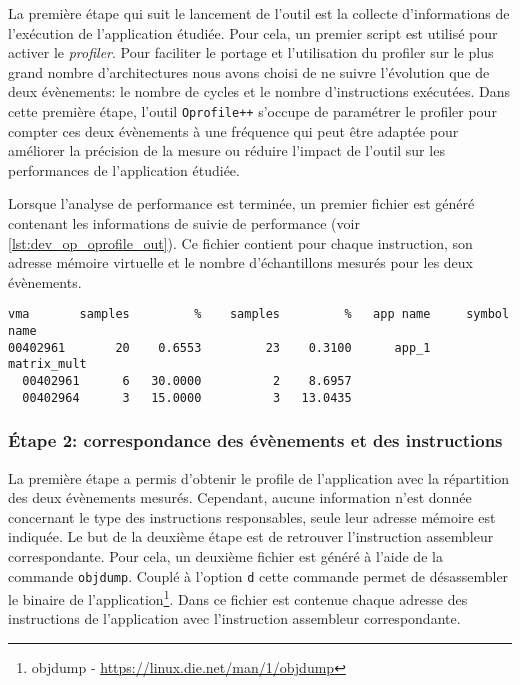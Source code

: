         La première étape qui suit le lancement de l'outil est la collecte d'informations de l'exécution de l'application étudiée. Pour cela, un premier script est utilisé pour activer le \textit{profiler}. Pour faciliter le portage et l'utilisation du profiler sur le plus grand nombre d'architectures nous avons choisi de ne suivre l'évolution que de deux évènements: le nombre de cycles et le nombre d'instructions exécutées. Dans cette première étape, l'outil \verb=Oprofile++= s'occupe de paramétrer le profiler pour compter ces deux évènements à une fréquence qui peut être adaptée pour améliorer la précision de la mesure ou réduire l'impact de l'outil sur les performances de l'application étudiée. 

        Lorsque l'analyse de performance est terminée, un premier fichier est généré contenant les informations de suivie de performance (voir \autoref{lst:dev_op_oprofile_out}). Ce fichier contient pour chaque instruction, son adresse mémoire virtuelle et le nombre d'échantillons mesurés pour les deux évènements. 
        
\begin{lstlisting}[label=lst:dev_op_oprofile_out, caption=Le premier fichier contient les données de performance pour les deux évènements étudiés.]
vma       samples         %    samples         %   app name     symbol name
00402961       20    0.6553         23    0.3100      app_1     matrix_mult
  00402961      6   30.0000          2    8.6957
  00402964      3   15.0000          3   13.0435
\end{lstlisting}   
  
  
        
    \subsubsection{Étape 2: correspondance des évènements et des instructions}

    La première étape a permis d'obtenir le profile de l'application avec la répartition des deux évènements mesurés. Cependant, aucune information n'est donnée concernant le type des instructions responsables, seule leur adresse mémoire est indiquée. Le but de la deuxième étape est de retrouver l'instruction assembleur correspondante. Pour cela, un deuxième fichier est généré à l'aide de la commande \verb=objdump=. Couplé à l'option \verb=d= cette commande permet de désassembler le binaire de l'application\footnote{objdump - \url{https://linux.die.net/man/1/objdump}}. Dans ce fichier est contenue chaque adresse des instructions de l'application avec l'instruction assembleur correspondante.

